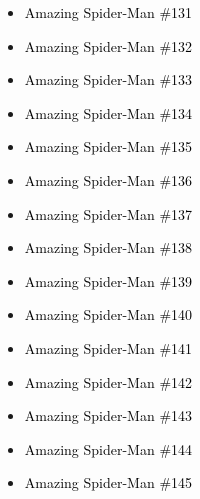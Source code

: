 \documentclass[12pt]{article}
\newcommand{\checkbox}{\raisebox{0.0ex}{\fbox{\rule{0ex}{1.5ex} \rule{1.5ex}{0ex}}}}
\begin{document}
\begin{center}
\begin{tcolorbox}[colback=white!95!gray, colframe=black, width=0.9\textwidth, arc=4mm, auto outer arc, boxrule=0.8pt]
\begin{itemize}[left=0pt,label={\checkbox}]
    \item \textcolor{black}{Amazing Spider-Man \#131}
    \item \textcolor{black}{Amazing Spider-Man \#132}
    \item \textcolor{black}{Amazing Spider-Man \#133}
    \item \textcolor{black}{Amazing Spider-Man \#134}
    \item \textcolor{black}{Amazing Spider-Man \#135}
    \item \textcolor{black}{Amazing Spider-Man \#136}
    \item \textcolor{black}{Amazing Spider-Man \#137}
    \item \textcolor{black}{Amazing Spider-Man \#138}
    \item \textcolor{black}{Amazing Spider-Man \#139}
    \item \textcolor{black}{Amazing Spider-Man \#140}
    \item \textcolor{black}{Amazing Spider-Man \#141}
    \item \textcolor{black}{Amazing Spider-Man \#142}
    \item \textcolor{black}{Amazing Spider-Man \#143}
    \item \textcolor{black}{Amazing Spider-Man \#144}
    \item \textcolor{black}{Amazing Spider-Man \#145}
\end{itemize}
\end{tcolorbox}
\end{center}
\end{document}
